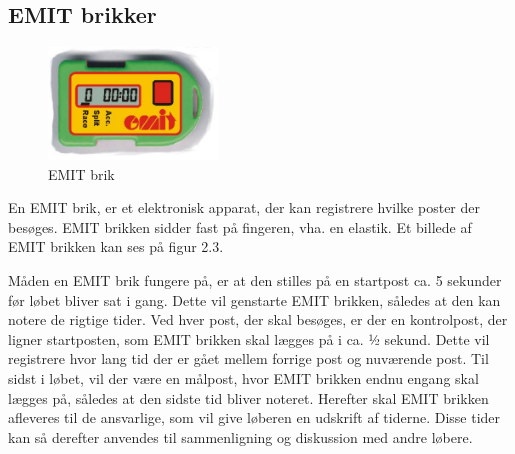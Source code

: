 \subsection{EMIT brikker}
\begin{figure}
	\vspace{5pt}
	\begin{center}
		\includegraphics[width=0.4\textwidth]{billeder/emitbrik}
	\end{center}
	\vspace{-20pt}
	\caption{EMIT brik}
	\vspace{-10pt}
\end{figure}
En EMIT brik, er et elektronisk apparat, der kan registrere hvilke poster der besøges. EMIT brikken sidder fast på fingeren, vha. en elastik. Et billede af EMIT brikken kan ses på figur 2.3.

Måden en EMIT brik fungere på, er at den stilles på en startpost ca. 5 sekunder før løbet bliver sat i gang. Dette vil genstarte EMIT brikken, således at den kan notere de rigtige tider. 
Ved hver post, der skal besøges, er der en kontrolpost, der ligner startposten, som EMIT brikken skal lægges på i ca. ½ sekund. Dette vil registrere hvor lang tid der er gået mellem forrige post og nuværende post. \newline
Til sidst i løbet, vil der være en målpost, hvor EMIT brikken endnu engang skal lægges på, således at den sidste tid bliver noteret. 
Herefter skal EMIT brikken afleveres til de ansvarlige, som vil give løberen en udskrift af tiderne. Disse tider kan så derefter anvendes til sammenligning og diskussion med andre løbere. \citep{OOK}

